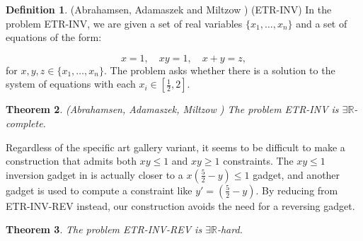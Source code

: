 \documentclass[11pt]{article}
\newcommand{\rr}{\mathbb R}
\theoremstyle{plain}
\newtheorem{theorem}{Theorem}
\theoremstyle{definition}
\newtheorem{definition}[theorem]{Definition}
\numberwithin{theorem}{section}
\begin{document}
\begin{definition}(Abrahamsen, Adamaszek and Miltzow \cite{ExistsRHardness})
(ETR-INV) In the problem ETR-INV, we are given a set of real variables $\{x_1, \dots, x_n\}$ and a set of equations of the form:

\[x=1,\quad xy=1,\quad x+y=z,\]
for $x, y, z\in \{x_1,\dots, x_n\}$. The problem asks whether there is a solution to the system of equations with each $x_i\in[\frac12, 2]$.
\end{definition}

\begin{theorem}(Abrahamsen, Adamaszek, Miltzow \cite{ExistsRHardness})
The problem ETR-INV is $\exists\rr$-complete.
\end{theorem}

Regardless of the specific art gallery variant, it seems to be difficult to make a construction that admits both $xy\le 1$ and $xy\ge 1$ constraints. The $xy\le 1$ inversion gadget in \cite{ExistsRHardness} is actually closer to a $x\left(\frac52-y\right)\le 1$ gadget, and another gadget is used to compute a constraint like $y'=\left(\frac52-y\right)$. By reducing from ETR-INV-REV instead, our construction avoids the need for a reversing gadget.

\begin{theorem}\label{ETRRevHardness}
The problem ETR-INV-REV is $\exists\rr$-hard.
\end{theorem}
\end{document}
